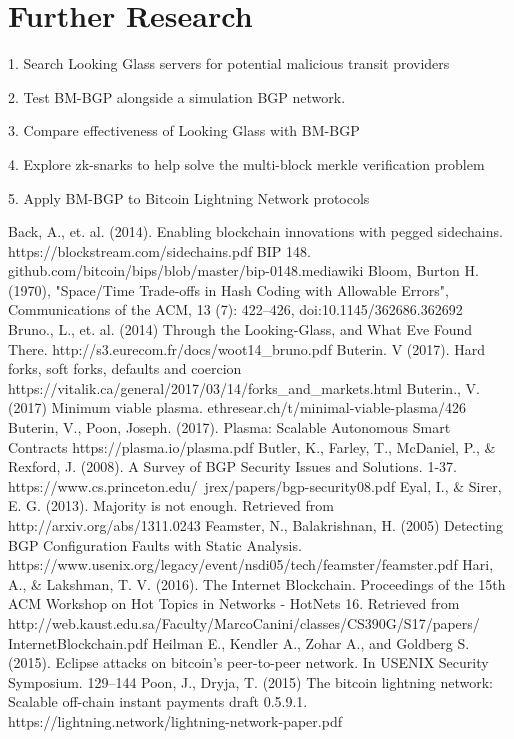 \documentclass[letterpaper, 10 pt, conference]{ieeeconf}  %
\begin{document}
\section{Further Research}
1. Search Looking Glass servers for potential malicious transit providers

2. Test BM-BGP alongside a simulation BGP network.

3. Compare effectiveness of Looking Glass with BM-BGP

4. Explore zk-snarks to help solve the multi-block merkle verification problem

5. Apply BM-BGP to Bitcoin Lightning Network protocols

\begin{thebibliography}{99}

Back, A., et. al. (2014). Enabling blockchain innovations with pegged sidechains. https://blockstream.com/sidechains.pdf
 BIP 148. github.com/bitcoin/bips/blob/master/bip-0148.mediawiki
 Bloom, Burton H. (1970), "Space/Time Trade-offs in Hash Coding with Allowable Errors", Communications of the ACM, 13 (7): 422–426, doi:10.1145/362686.362692
 Bruno., L., et. al. (2014) Through the Looking-Glass, and What Eve Found There. http://s3.eurecom.fr/docs/woot14\_bruno.pdf
 Buterin. V (2017). Hard forks, soft forks, defaults and coercion https://vitalik.ca/general/2017/03/14/forks\_and\_markets.html
 Buterin., V. (2017) Minimum viable plasma. ethresear.ch/t/minimal-viable-plasma/426
 Buterin, V., Poon, Joseph. (2017). Plasma: Scalable Autonomous Smart Contracts https://plasma.io/plasma.pdf
 Butler, K., Farley, T., McDaniel, P., \& Rexford, J. (2008). A
Survey of BGP Security Issues and Solutions. 1-37. https://www.cs.princeton.edu/~jrex/papers/bgp-security08.pdf
 Eyal, I., \& Sirer, E. G. (2013). Majority is not enough. Retrieved from http://arxiv.org/abs/1311.0243
Feamster, N., Balakrishnan, H. (2005) Detecting BGP Configuration Faults with Static Analysis. https://www.usenix.org/legacy/event/nsdi05/tech/feamster/feamster.pdf
 Hari, A., \& Lakshman, T. V. (2016). The Internet Blockchain. Proceedings of the 15th ACM Workshop on Hot Topics in Networks - HotNets 16. Retrieved from http://web.kaust.edu.sa/Faculty/MarcoCanini/classes/CS390G/S17/papers/
InternetBlockchain.pdf
 Heilman E., Kendler A., Zohar A., and Goldberg S. (2015). Eclipse attacks on bitcoin’s peer-to-peer network. In USENIX Security Symposium. 129–144
 Poon, J., Dryja, T. (2015) The bitcoin lightning network: Scalable off-chain instant payments draft 0.5.9.1. https://lightning.network/lightning-network-paper.pdf

\end{thebibliography}
\end{document}
